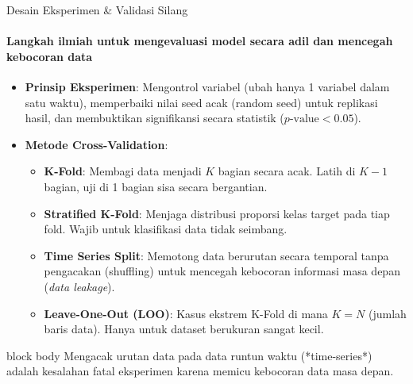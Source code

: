 \documentclass[aspectratio=169,t]{beamer}
\newcommand{\takeaway}[1]{%
  \vspace{0.1em}
  \begin{beamercolorbox}[rounded=true,shadow=false,sep=5pt]{block body}
    \centering\footnotesize\color{nvlightgreen}#1
  \end{beamercolorbox}%
}
\begin{document}
\begin{frame}{Desain Eksperimen \& Validasi Silang}
  \framesubtitle{Langkah ilmiah untuk mengevaluasi model secara adil dan mencegah kebocoran data}
  \begin{itemize}\footnotesize
    \item \textbf{Prinsip Eksperimen}: Mengontrol variabel (ubah hanya 1 variabel dalam satu waktu), memperbaiki nilai seed acak (random seed) untuk replikasi hasil, dan membuktikan signifikansi secara statistik ($p\text{-value} < 0.05$).
    \item \textbf{Metode Cross-Validation}:
      \begin{itemize}\scriptsize
        \item \textbf{K-Fold}: Membagi data menjadi $K$ bagian secara acak. Latih di $K-1$ bagian, uji di 1 bagian sisa secara bergantian.
        \item \textbf{Stratified K-Fold}: Menjaga distribusi proporsi kelas target pada tiap fold. Wajib untuk klasifikasi data tidak seimbang.
        \item \textbf{Time Series Split}: Memotong data berurutan secara temporal tanpa pengacakan (shuffling) untuk mencegah kebocoran informasi masa depan (\emph{data leakage}).
        \item \textbf{Leave-One-Out (LOO)}: Kasus ekstrem K-Fold di mana $K = N$ (jumlah baris data). Hanya untuk dataset berukuran sangat kecil.
      \end{itemize}
  \end{itemize}
  \takeaway{Mengacak urutan data pada data runtun waktu (*time-series*) adalah kesalahan fatal eksperimen karena memicu kebocoran data masa depan.}
\end{frame}
\end{document}

